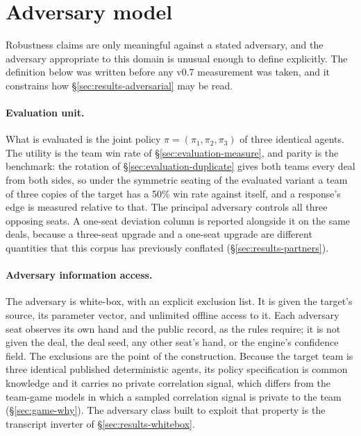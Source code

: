 \section{Adversary model}
\label{sec:threat}

Robustness claims are only meaningful against a stated adversary, and the adversary appropriate to
this domain is unusual enough to define explicitly. The definition below was written before any v0.7
measurement was taken, and it constrains how \S\ref{sec:results-adversarial} may be read.

\paragraph{Evaluation unit.} What is evaluated is the joint policy $\pi = (\pi_1,\pi_2,\pi_3)$ of
three identical agents. The utility is the team win rate of \S\ref{sec:evaluation-measure}, and
parity is the benchmark: the rotation of \S\ref{sec:evaluation-duplicate} gives both teams every
deal from both sides, so under the symmetric seating of the evaluated variant a team of three copies
of the target has a 50\% win rate against itself, and a response's edge is measured relative to that.
The principal adversary controls all three opposing seats. A one-seat deviation column is reported
alongside it on the same deals, because a three-seat upgrade and a one-seat upgrade are different
quantities that this corpus has previously conflated (\S\ref{sec:results-partners}).

\paragraph{Adversary information access.} The adversary is white-box, with an explicit exclusion
list. It is given the target's source, its parameter vector, and unlimited offline access to it. Each
adversary seat observes its own hand and the public record, as the rules require; it is not given
the deal, the deal seed, any other seat's hand, or the engine's confidence field. The exclusions are
the point of the construction. Because the target team is three identical published deterministic
agents, its policy specification is common knowledge and it carries no private correlation signal,
which differs from the team-game models in which a sampled correlation signal is private to the team
\cite{celli-gatti,farina-collusion} (\S\ref{sec:game-why}). The adversary class built to exploit
that property is the transcript inverter of \S\ref{sec:results-whitebox}.

